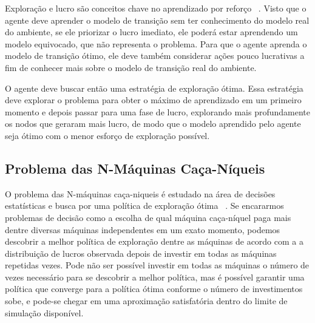 Exploração e lucro são conceitos chave no aprendizado por reforço ~\cite[Cap 21, pp830-859]{AIMA}. Visto que o agente deve aprender o modelo de transição sem ter conhecimento do modelo real do ambiente, se ele priorizar o lucro imediato, ele poderá estar aprendendo um modelo equivocado, que não representa o problema. Para que o agente aprenda o modelo de transição ótimo, ele deve também considerar ações pouco lucrativas a fim de conhecer mais sobre o modelo de transição real do ambiente.

O agente deve buscar então uma estratégia de exploração ótima. Essa estratégia deve explorar o problema para obter o máximo de aprendizado em um primeiro momento e depois passar para uma fase de lucro, explorando mais profundamente os nodos que geraram mais lucro, de modo que o modelo aprendido pelo agente seja ótimo com o menor esforço de exploração possível.







\subsection{\label{sec:secao4.4}Problema das N-Máquinas Caça-Níqueis}

O problema das N-máquinas caça-niqueis é estudado na área de decisões estatísticas e busca por uma política de exploração ótima ~\cite{BANDITSPROBLEMS}. Se encararmos problemas de decisão como a escolha de qual máquina caça-níquel paga mais dentre diversas máquinas independentes em um exato momento, podemos descobrir a melhor política de exploração dentre as máquinas de acordo com a a distribuição de lucros observada depois de investir em todas as máquinas repetidas vezes. Pode não ser possível investir em todas as máquinas o número de vezes necessário para se descobrir a melhor política, mas é possível garantir uma política que converge para a política ótima conforme o número de investimentos sobe, e pode-se chegar em uma aproximação satisfatória dentro do limite de simulação disponível.


